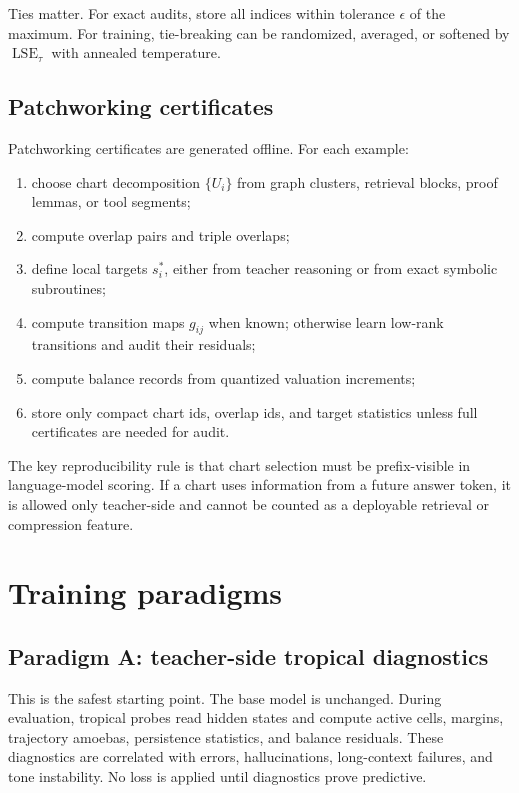 \documentclass[11pt]{article}
\newcommand{\LSE}{\operatorname{LSE}}
\begin{document}
Ties matter.  For exact audits, store all indices within tolerance \(\epsilon\) of the maximum.  For training, tie-breaking can be randomized, averaged, or softened by \(\LSE_\tau\) with annealed temperature.

\subsection{Patchworking certificates}

Patchworking certificates are generated offline.  For each example:
\begin{enumerate}
\item choose chart decomposition \(\{U_i\}\) from graph clusters, retrieval blocks, proof lemmas, or tool segments;
\item compute overlap pairs and triple overlaps;
\item define local targets \(s_i^*\), either from teacher reasoning or from exact symbolic subroutines;
\item compute transition maps \(g_{ij}\) when known; otherwise learn low-rank transitions and audit their residuals;
\item compute balance records from quantized valuation increments;
\item store only compact chart ids, overlap ids, and target statistics unless full certificates are needed for audit.
\end{enumerate}

The key reproducibility rule is that chart selection must be prefix-visible in language-model scoring.  If a chart uses information from a future answer token, it is allowed only teacher-side and cannot be counted as a deployable retrieval or compression feature.

\section{Training paradigms}

\subsection{Paradigm A: teacher-side tropical diagnostics}

This is the safest starting point.  The base model is unchanged.  During evaluation, tropical probes read hidden states and compute active cells, margins, trajectory amoebas, persistence statistics, and balance residuals.  These diagnostics are correlated with errors, hallucinations, long-context failures, and tone instability.  No loss is applied until diagnostics prove predictive.
\end{document}
